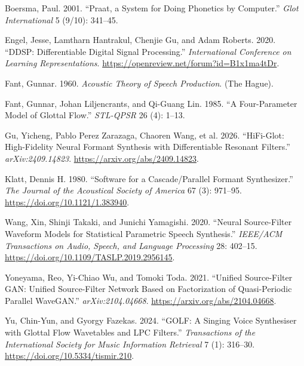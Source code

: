 \protect{}\label{refs}
\begin{CSLReferences}{1}{1}
Boersma, Paul. 2001. {``Praat, a System for Doing Phonetics by
Computer.''} \emph{Glot International} 5 (9/10): 341--45.

Engel, Jesse, Lamtharn Hantrakul, Chenjie Gu, and Adam Roberts. 2020.
{``DDSP: Differentiable Digital Signal Processing.''}
\emph{International Conference on Learning Representations}.
\url{https://openreview.net/forum?id=B1x1ma4tDr}.

Fant, Gunnar. 1960. \emph{Acoustic Theory of Speech Production}. (The
Hague).

Fant, Gunnar, Johan Liljencrants, and Qi-Guang Lin. 1985. {``A
Four-Parameter Model of Glottal Flow.''} \emph{STL-QPSR} 26 (4): 1--13.

Gu, Yicheng, Pablo Perez Zarazaga, Chaoren Wang, et al. 2026.
{``HiFi-Glot: High-Fidelity Neural Formant Synthesis with Differentiable
Resonant Filters.''} \emph{arXiv:2409.14823}.
\url{https://arxiv.org/abs/2409.14823}.

Klatt, Dennis H. 1980. {``Software for a Cascade/Parallel Formant
Synthesizer.''} \emph{The Journal of the Acoustical Society of America}
67 (3): 971--95. \url{https://doi.org/10.1121/1.383940}.

Wang, Xin, Shinji Takaki, and Junichi Yamagishi. 2020. {``Neural
Source-Filter Waveform Models for Statistical Parametric Speech
Synthesis.''} \emph{IEEE/ACM Transactions on Audio, Speech, and Language
Processing} 28: 402--15.
\url{https://doi.org/10.1109/TASLP.2019.2956145}.

Yoneyama, Reo, Yi-Chiao Wu, and Tomoki Toda. 2021. {``Unified
Source-Filter GAN: Unified Source-Filter Network Based on Factorization
of Quasi-Periodic Parallel WaveGAN.''} \emph{arXiv:2104.04668}.
\url{https://arxiv.org/abs/2104.04668}.

Yu, Chin-Yun, and Gyorgy Fazekas. 2024. {``GOLF: A Singing Voice
Synthesiser with Glottal Flow Wavetables and LPC Filters.''}
\emph{Transactions of the International Society for Music Information
Retrieval} 7 (1): 316--30. \url{https://doi.org/10.5334/tismir.210}.

\end{CSLReferences}
